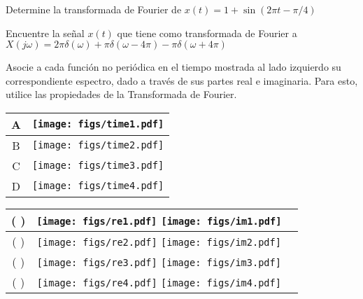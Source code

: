 
\begin{ejercicio}
    Determine la transformada de Fourier de $x(t)=1+\sin(2\pi t-\pi/4)$
\end{ejercicio}

\begin{ejercicio}
    Encuentre la señal $x(t)$ que tiene como transformada de Fourier a $X(j\omega) = 2\pi \delta (\omega) + \pi \delta (\omega-4\pi) - \pi \delta (\omega + 4\pi)$
\end{ejercicio}

\begin{ejercicio}
    Asocie a cada función no periódica en el tiempo mostrada al lado izquierdo su correspondiente espectro, dado a través de sus partes real e imaginaria. Para esto, utilice las propiedades de la Transformada de Fourier.\\[15pt]
    \begin{minipage}{5in}
        \begin{tabular}{|c|l|}
            \hline
            A & \texttt{[image: figs/time1.pdf]}\\
            \hline
            B & \texttt{[image: figs/time2.pdf]}\\
            \hline
            C & \texttt{[image: figs/time3.pdf]}\\
            \hline
            D & \texttt{[image: figs/time4.pdf]}\\
            \hline
        \end{tabular}
    \hspace{0.4cm}
        \begin{tabular}{|c|c|c|}
            \hline
                (  ) &
                \texttt{[image: figs/re1.pdf]}
                \texttt{[image: figs/im1.pdf]}
            \\
            \hline
                (  ) &
                \texttt{[image: figs/re2.pdf]}
                \texttt{[image: figs/im2.pdf]}
            \\
            \hline
                (  ) &
                \texttt{[image: figs/re3.pdf]}
                \texttt{[image: figs/im3.pdf]}
            \\
            \hline
                (  ) &
                \texttt{[image: figs/re4.pdf]}
                \texttt{[image: figs/im4.pdf]}
            \\
            \hline
        \end{tabular}
    \end{minipage}
\end{ejercicio}

